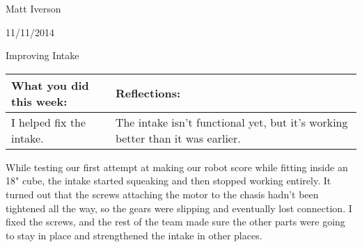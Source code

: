 Matt Iverson

11/11/2014

Improving Intake

\begin{tabular}{|p{5cm}|p{5cm}|}
 \hline
 What you did this week:
 &
 Reflections:
 \\
 \hline
 I helped fix the intake.
 &
 The intake isn't functional yet, but it's working better than it was earlier.
 \\
 \hline
\end{tabular}


While testing our first attempt at making our robot score while fitting inside an 18" cube, the intake started squeaking and then stopped working entirely. It turned out that the screws attaching the motor to the chasis hadn't been tightened all the way, so the gears were slipping and eventually lost connection. I fixed the screws, and the rest of the team made sure the other parts were going to stay in place and strengthened the intake in other places.
